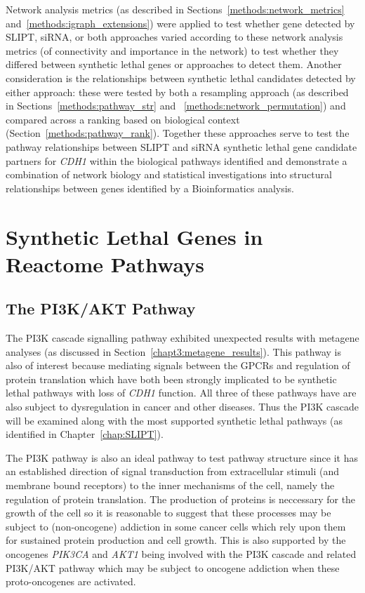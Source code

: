 Network analysis metrics (as described in Sections~\ref{methods:network_metrics} and~\ref{methods:igraph_extensions}) were applied to test whether gene detected by SLIPT, siRNA, or both approaches varied according to these network analysis metrics (of connectivity and importance in the network) to test whether they differed between synthetic lethal genes or approaches to detect them. Another consideration is the relationships between synthetic lethal candidates detected by either approach: these were tested by both a resampling approach (as described in Sections~\ref{methods:pathway_str} and ~\ref{methods:network_permutation}) and compared across a ranking based on biological context (Section~\ref{methods:pathway_rank}). Together these approaches serve to test the pathway relationships between SLIPT and siRNA synthetic lethal gene candidate partners for \textit{CDH1} within the biological pathways identified and demonstrate a combination of network biology and statistical investigations into structural relationships between genes identified by a Bioinformatics analysis.

\FloatBarrier

\section{Synthetic Lethal Genes in Reactome Pathways} \label{chapt4:SL_Genes}

\FloatBarrier

\subsection{The PI3K/AKT Pathway}  \label{chapt4:SL_Genes_PI3K}

The \acrfull{PI3K} cascade signalling pathway exhibited unexpected results with metagene analyses (as discussed in Section~\ref{chapt3:metagene_results}). This pathway is also of interest because mediating signals between the \glspl{GPCR} and regulation of protein translation which have both been strongly implicated to be synthetic lethal pathways with loss of \textit{CDH1} function. All three of these pathways have are also subject to dysregulation in cancer and other diseases. Thus the PI3K cascade will be examined along with the most supported synthetic lethal pathways (as identified in Chapter~\ref{chap:SLIPT}).

The \gls{PI3K} pathway is also an ideal pathway to test pathway structure since it has an established direction of signal transduction from extracellular stimuli (and membrane bound receptors) to the inner mechanisms of the cell, namely the regulation of protein translation. The production of proteins is neccessary for the growth of the cell so it is reasonable to suggest that these processes may be subject to (non-oncogene) addiction in some cancer cells which rely upon them for sustained protein production and cell growth. This is also supported by the oncogenes \textit{PIK3CA} and \textit{AKT1} being involved with the PI3K cascade and related PI3K/AKT pathway which may be subject to oncogene addiction when these proto-oncogenes are activated.

